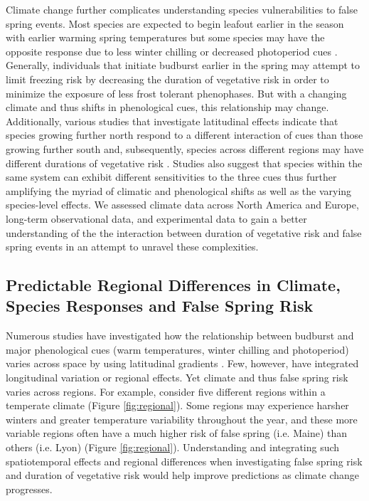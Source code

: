 \documentclass{article}\usepackage[]{graphicx}\usepackage[]{color}
\begin{document}
Climate change further complicates understanding species vulnerabilities to false spring events. Most species are expected to begin leafout earlier in the season with earlier warming spring temperatures but some species may have the opposite response due to less winter chilling or decreased photoperiod cues \citep{Cleland2006, Yu2010, Xin2016}. Generally, individuals that initiate budburst earlier in the spring may attempt to limit freezing risk by decreasing the duration of vegetative risk in order to minimize the exposure of less frost tolerant phenophases. But with a changing climate and thus shifts in phenological cues, this relationship may change. Additionally, various studies that investigate latitudinal effects indicate that species growing further north respond to a different interaction of cues than those growing further south and, subsequently, species across different regions may have different durations of vegetative risk \citep {Partanen2004, Viheraaarnio2006, Caffarra2011}. Studies also suggest that species within the same system can exhibit different sensitivities to the three cues \citep{Basler2012, Laube2013} thus further amplifying the myriad of climatic and phenological shifts as well as the varying species-level effects.  We assessed climate data across North America and Europe, long-term observational data, and experimental data to gain a better understanding of the the interaction between duration of vegetative risk and false spring events in an attempt to unravel these complexities.

\subsection {Predictable Regional Differences in Climate, Species Responses and False Spring Risk}
Numerous studies have investigated how the relationship between budburst and major phenological cues (warm temperatures, winter chilling and photoperiod) varies across space by using latitudinal gradients \citep{Partanen2004, Viheraaarnio2006, Caffarra2011, Zohner2016, Gauzere2017}. Few, however, have integrated longitudinal variation or regional effects. Yet climate and thus false spring risk varies across regions. For example, consider five different regions within a temperate climate (Figure \ref{fig:regional}). Some regions may experience harsher winters and greater temperature variability throughout the year, and these more variable regions often have a much higher risk of false spring (i.e. Maine) than others (i.e. Lyon) (Figure \ref{fig:regional}). Understanding and integrating such spatiotemporal effects and regional differences when investigating false spring risk and duration of vegetative risk would help improve predictions as climate change progresses.
\end{document}
